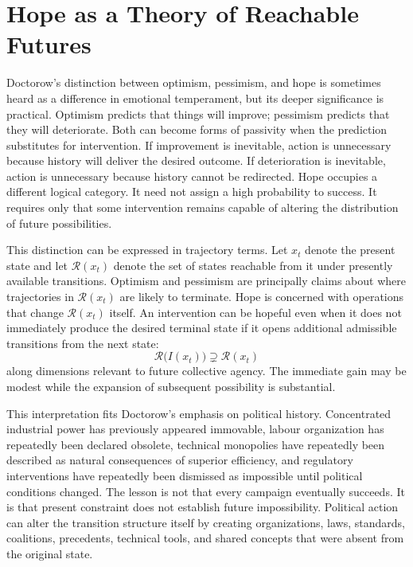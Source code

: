 \documentclass[11pt]{article}
\begin{document}
\section{Hope as a Theory of Reachable Futures}

Doctorow's distinction between optimism, pessimism, and hope is sometimes heard as a difference in emotional temperament, but its deeper significance is practical. Optimism predicts that things will improve; pessimism predicts that they will deteriorate. Both can become forms of passivity when the prediction substitutes for intervention. If improvement is inevitable, action is unnecessary because history will deliver the desired outcome. If deterioration is inevitable, action is unnecessary because history cannot be redirected. Hope occupies a different logical category. It need not assign a high probability to success. It requires only that some intervention remains capable of altering the distribution of future possibilities.

This distinction can be expressed in trajectory terms. Let \(x_t\) denote the present state and let \(\mathcal{R}(x_t)\) denote the set of states reachable from it under presently available transitions. Optimism and pessimism are principally claims about where trajectories in \(\mathcal{R}(x_t)\) are likely to terminate. Hope is concerned with operations that change \(\mathcal{R}(x_t)\) itself. An intervention can be hopeful even when it does not immediately produce the desired terminal state if it opens additional admissible transitions from the next state:
\[
\mathcal{R}\bigl(I(x_t)\bigr)
\supsetneq
\mathcal{R}(x_t)
\]
along dimensions relevant to future collective agency. The immediate gain may be modest while the expansion of subsequent possibility is substantial.

This interpretation fits Doctorow's emphasis on political history. Concentrated industrial power has previously appeared immovable, labour organization has repeatedly been declared obsolete, technical monopolies have repeatedly been described as natural consequences of superior efficiency, and regulatory interventions have repeatedly been dismissed as impossible until political conditions changed. The lesson is not that every campaign eventually succeeds. It is that present constraint does not establish future impossibility. Political action can alter the transition structure itself by creating organizations, laws, standards, coalitions, precedents, technical tools, and shared concepts that were absent from the original state.
\end{document}

